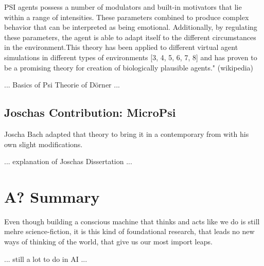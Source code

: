 PSI agents possess a number of modulators and built-in motivators that lie within a range of intensities. These parameters combined to produce complex behavior that can be interpreted as being emotional. Additionally, by regulating these parameters, the agent is able to adapt itself to the different circumstances in the environment.This theory has been applied to different virtual agent simulations in different types of environments [3, 4, 5, 6, 7, 8] and has proven to be a promising theory for creation of biologically plausible agents." (wikipedia)


... Basics of Psi Theorie of Dörner ...

\subsection{Joschas Contribution: MicroPsi}
Joscha Bach adapted that theory to bring it in a contemporary from with his own slight modifications.

... explanation of Joschas Dissertation ...

\section{A? Summary}
Even though building a conscious machine that thinks and acts like we do is still mehre science-fiction, it is this kind of foundational research, that leads no new ways of thinking of the world, that give us our most import leaps.

... still a lot to do in AI ...